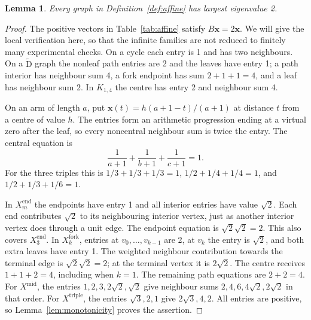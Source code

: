 \documentclass[11pt]{amsart}
\newcommand\Zx{{\mathbf x}}
\newtheorem{lemma}[theorem]{Lemma}
\theoremstyle{definition}
\newcommand{\typ}[1]{\mathrm{#1}}
\begin{document}
\begin{lemma}\label{lem:affine}
Every graph in Definition~\ref{def:affine} has largest eigenvalue 2.
\end{lemma}
\begin{proof}
The positive vectors in Table~\ref{tab:affine} satisfy $B\Zx=2\Zx$.
We will give the local verification here, so that the infinite families
are not reduced to finitely many experimental checks. On a cycle each
entry is 1 and has two neighbours. On a $\widetilde{\typ D}$ graph the
nonleaf path entries are 2 and the leaves have entry 1; a path interior
has neighbour sum 4, a fork endpoint has sum $2+1+1=4$, and a leaf has
neighbour sum 2. In $K_{1,4}$ the centre has entry 2 and neighbour sum 4.

On an arm of length $a$, put
$\Zx(t)=h(a+1-t)/(a+1)$ at distance $t$ from a centre of value $h$.
The entries form an arithmetic progression ending at a virtual zero after
the leaf, so every noncentral neighbour sum is twice the entry.
The central equation is
\[
 \frac1{a+1}+\frac1{b+1}+\frac1{c+1}=1.
\]
For the three triples this is $1/3+1/3+1/3=1$,
$1/2+1/4+1/4=1$, and $1/2+1/3+1/6=1$.

In $X^{\mathrm{end}}_m$ the endpoints have entry 1 and all interior entries have value
$\sqrt2$. Each end contributes $\sqrt2$ to its neighbouring interior
vertex, just as another interior vertex does through a unit edge.
The endpoint equation is $\sqrt2\sqrt2=2$. This also covers $X^{\mathrm{end}}_3$.
In $X^{\mathrm{fork}}_k$, entries at $v_0,\ldots,v_{k-1}$ are 2, at $v_k$ the entry is
$\sqrt2$, and both extra leaves have entry 1. The weighted neighbour
contribution towards the terminal edge is $\sqrt2\sqrt2=2$; at the
terminal vertex it is $2\sqrt2$. The centre receives $1+1+2=4$, including
when $k=1$. The remaining path equations are $2+2=4$.
For $X^{\mathrm{mid}}$, the entries $1,2,3,2\sqrt2,\sqrt2$ give neighbour sums
$2,4,6,4\sqrt2,2\sqrt2$ in that order. For $X^{\mathrm{triple}}$, the entries
$\sqrt3,2,1$ give $2\sqrt3,4,2$. All entries are positive, so
Lemma~\ref{lem:monotonicity} proves the assertion.
\end{proof}
\end{document}
